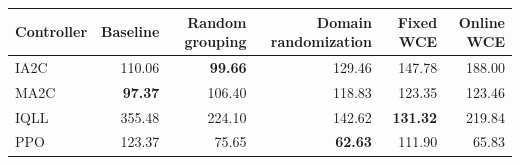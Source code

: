\begin{tabular}{lrrrrr}
\hline
Controller & Baseline & Random grouping & Domain randomization & Fixed WCE & Online WCE \\
\hline
IA2C & 110.06 & \textbf{99.66} & 129.46 & 147.78 & 188.00 \\
MA2C & \textbf{97.37} & 106.40 & 118.83 & 123.35 & 123.46 \\
IQLL & 355.48 & 224.10 & 142.62 & \textbf{131.32} & 219.84 \\
PPO & 123.37 & 75.65 & \textbf{62.63} & 111.90 & 65.83 \\
\hline
\end{tabular}
